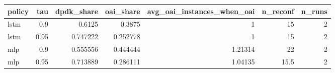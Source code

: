\begin{tabular}{lrrrrrr}
\toprule
policy & tau & dpdk_share & oai_share & avg_oai_instances_when_oai & n_reconf & n_runs \\
\midrule
lstm & 0.9 & 0.6125 & 0.3875 & 1 & 15 & 2 \\
lstm & 0.95 & 0.747222 & 0.252778 & 1 & 15 & 2 \\
mlp & 0.9 & 0.555556 & 0.444444 & 1.21314 & 22 & 2 \\
mlp & 0.95 & 0.713889 & 0.286111 & 1.04135 & 15.5 & 2 \\
\bottomrule
\end{tabular}

